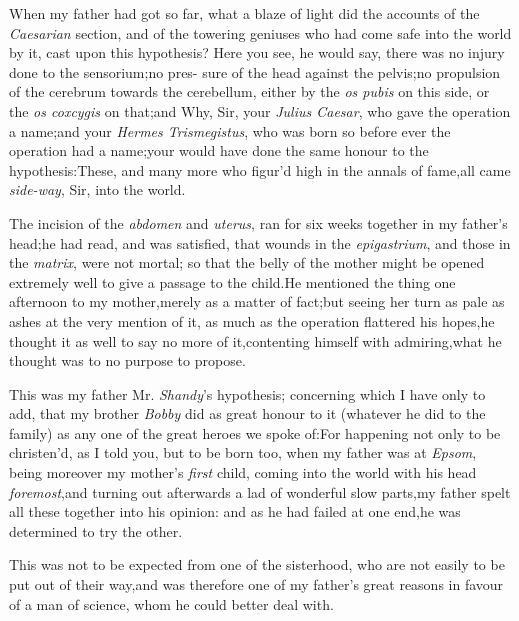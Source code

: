 \documentclass{article}
\begin{document}
When my father had got so far,\tsh\break
what a blaze of light did the accounts of the \textit{Caesarian} section, and of the
towering geniuses who had come safe into the world by it, cast upon
this hypothesis? Here you see, he would say, there was no injury
done to the sensorium;\tsk no pres- sure of the head against the
pelvis;\tsk no\break
propulsion of the cerebrum towards the
cerebellum, either by the \textit{os pubis} on this side, or the \textit{os
coxcygis} on that;\tsk and\break
{}\break 
Why, Sir, your \textit{Julius Caesar}, who gave the
operation a name;\tsk and your \textit{Hermes Trismegistus}, who
was born so before ever the operation had a name;\tsk your
would have done
the same honour to the hypothesis:\tsk These, and many
more who figur’d high in the annals of fame,\tsk all came
\textit{side-way}, Sir, into the world.

The incision of the \textit{abdomen} and \textit{ute\-rus},
ran for six weeks together in my father’s
head;\tsk he had read, and was satisfied, that wounds in
the \textit{epigastrium}, and those in the \textit{matrix}, were not
mortal;\tsk\break
so that the belly of the mother might be
opened extremely well to give a passage to the child.\tsk He mentioned the thing one
afternoon to my mother,\tsk merely as a matter of fact;\tsk but seeing her turn as pale
as ashes at the very mention of it, as much as the operation flattered his
hopes,\tsk he thought it as well to say no more of it,\tsk contenting himself with
admiring,\tsk what he thought was to no purpose to propose.

This was my father Mr. \textit{Shandy}’s hypothesis; concerning
which I have only to add, that my brother \textit{Bobby} did as
great honour to it (whatever he did to the family) as any one of
the great heroes we spoke of:\tsk For happening not only to be
christen’d, as I told you, but to be born too, when my father
was at \textit{Epsom},\tsk\break
being moreover my mother’s \textit{first} child,\break
\tsk coming into the world with his head
\textit{foremost},\tsk and turning out afterwards a lad of
wonderful slow parts,\tsh my father spelt all these together
into his opinion: and as he had failed at one end,\tsk he was
determined to try the other.

This was not to be expected from one of the sisterhood, who are
not easily to be put out of their way,\tsh and was
therefore one of my father’s great reasons in favour of a man
of science, whom he could better deal with.
\end{document}
